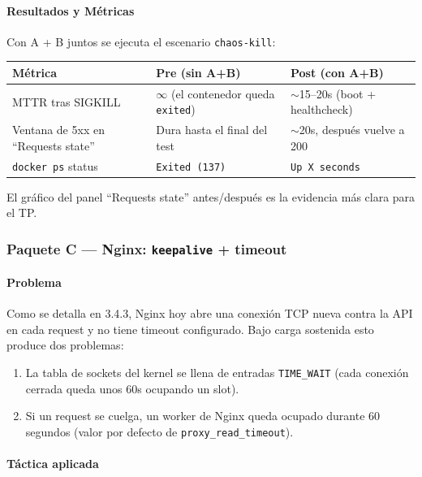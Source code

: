 \paragraph{Resultados y Métricas}

Con A + B juntos se ejecuta el escenario \texttt{chaos-kill}:

\begin{table}[H]
\centering
\setlength{\tabcolsep}{4pt}
\begin{tabular}{lp{4cm}p{4cm}}
\toprule
\textbf{Métrica} & \textbf{Pre (sin A+B)} & \textbf{Post (con A+B)} \\
\midrule
MTTR tras SIGKILL & $\infty$ (el contenedor queda \texttt{exited}) & $\sim$15--20s (boot + healthcheck) \\
Ventana de 5xx en ``Requests state'' & Dura hasta el final del test & $\sim$20s, después vuelve a 200 \\
\texttt{docker ps} status & \texttt{Exited (137)} & \texttt{Up X seconds} \\
\bottomrule
\end{tabular}
\end{table}

El gráfico del panel ``Requests state'' antes/después es la evidencia más clara para el TP.

\subsubsection{Paquete C — Nginx: \texttt{keepalive} + timeout}

\paragraph{Problema}

Como se detalla en 3.4.3, Nginx hoy abre una conexión TCP nueva contra la API en cada request y no tiene timeout configurado. Bajo carga sostenida esto produce dos problemas:
\begin{enumerate}[leftmargin=*]
    \item La tabla de sockets del kernel se llena de entradas \texttt{TIME\_WAIT} (cada conexión cerrada queda unos 60s ocupando un slot).
    \item Si un request se cuelga, un worker de Nginx queda ocupado durante 60 segundos (valor por defecto de \texttt{proxy\_read\_timeout}).
\end{enumerate}

\paragraph{Táctica aplicada}

